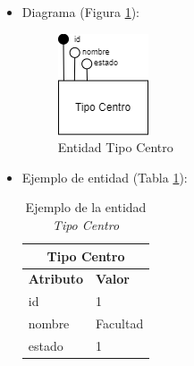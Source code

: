 \begin{itemize}
\begin{itemize}
        \item estado
        \begin{itemize}
            \item Definición: estado del tipo de centro.
            \item Dominio: 1 (Habilitado), 0 (Deshabilitado).
            \item Tipo: atributo simple.
            \item Opcional: no
            \item Ejemplo: 1
        \end{itemize}
    \end{itemize}

    \item Diagrama (Figura \ref{fig:E-TipoCentro}):

    \begin{figure}[H]
        \centering
        \includegraphics[scale=0.8]{img/diagramas/EER/E-TipoCentro.png}
        \caption{Entidad Tipo Centro}
        \label{fig:E-TipoCentro}
    \end{figure}

    \item Ejemplo de entidad (Tabla \ref{table:T-TipoCentro}):

    \begin{table}[H]
    \centering
        \begin{tabular}{ |p{6cm}||p{6cm}|  }
             \hline
                \multicolumn{2}{|c|}{\textbf{Tipo Centro}} \\
             \hline
                 \textbf{Atributo} & \textbf{Valor} \\
             \hline
                 id & 1 \\
             \hline
                 nombre & Facultad \\
             \hline
                 estado & 1 \\
        \end{tabular}
        \caption{Ejemplo de la entidad \textit{Tipo Centro}}
        \label{table:T-TipoCentro}
    \end{table}
\end{itemize}

